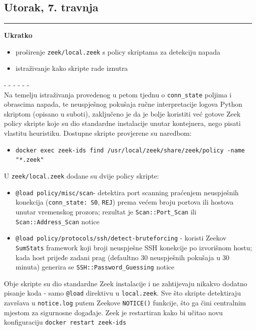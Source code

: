 \documentclass[12pt, a4paper]{article}
\newcommand{\dan}[1]{
    \subsection*{#1}
    \vspace{-0.5em} 
    \hrule \vspace{0.5em} 
}
\begin{document}
\dan{Utorak, 7. travnja}
\textbf{Ukratko}
\begin{itemize}
    \item proširenje \lstinline|zeek/local.zeek| s policy skriptama za detekciju napada
    \item istraživanje kako skripte rade iznutra
\end{itemize}
- - - - - - \\
Na temelju istraživanja provedenog u petom tjednu o \lstinline|conn_state| poljima i
obrascima napada, te neuspješnog pokušaja ručne interpretacije logova Python skriptom
(opisano u suboti), zaključeno je da je bolje koristiti već gotove Zeek policy skripte
koje su dio standardne instalacije unutar kontejnera, nego pisati vlastitu heuristiku.
Dostupne skripte provjerene su naredbom:
\begin{itemize}
    \item \lstinline|docker exec zeek-ids find /usr/local/zeek/share/zeek/policy -name "*.zeek"|
\end{itemize}
U \lstinline|zeek/local.zeek| dodane su dvije policy skripte:
\begin{itemize}
    \item \lstinline|@load policy/misc/scan|- detektira port scanning praćenjem
    neuspješnih konekcija (\lstinline|conn_state: S0|, \lstinline|REJ|) prema većem broju
    portova ili hostova unutar vremenskog prozora; rezultat je \lstinline|Scan::Port_Scan|
    ili \lstinline|Scan::Address_Scan| notice
    \item \lstinline|@load policy/protocols/ssh/detect-bruteforcing| - koristi Zeekov
    \lstinline|SumStats| framework koji broji neuspješne SSH konekcije po izvorišnom hostu;
    kada host prijeđe zadani prag (defaultno 30 neuspješnih pokušaja u 30 minuta) generira
    se \lstinline|SSH::Password_Guessing| notice
\end{itemize}
Obje skripte su dio standardne Zeek instalacije i ne zahtijevaju nikakvo dodatno pisanje
koda - samo \lstinline|@load| direktivu u \lstinline|local.zeek|.
Sve što skripte detektiraju završava u \lstinline|notice.log| putem Zeekove
\lstinline|NOTICE()| funkcije, što ga čini centralnim mjestom za sigurnosne događaje.
Zeek je restartiran kako bi učitao novu konfiguraciju \lstinline|docker restart zeek-ids|
\end{document}
